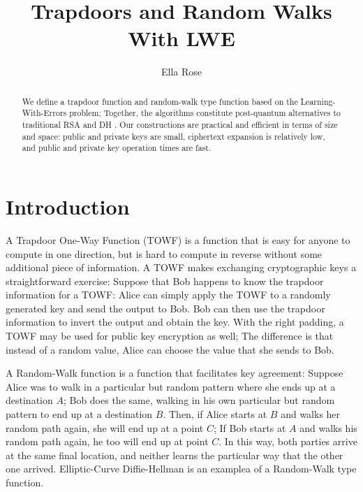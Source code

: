 \documentclass[preprint]{iacrtrans}
\author{Ella Rose}
\institute{Paso Robles, CA \email{python_pride@protonmail.com}}
\title[Trapdoors and Random Walks With LWE]{Trapdoors and Random Walks With LWE}
\begin{document}
\maketitle


\begin{abstract}
 We define a trapdoor function and random-walk type function based on the Learning-With-Errors problem; Together, the algorithms constitute post-quantum alternatives to traditional RSA and DH . Our constructions are practical and efficient in terms of size and space: public and private keys are small, ciphertext expansion is relatively low, and public and private key operation times are fast.
 \end{abstract}

\todototoc
\listoftodos


\section{Introduction}
A Trapdoor One-Way Function (TOWF) is a function that is easy for anyone to compute in one direction, but is hard to compute in reverse without some additional piece of information. A TOWF makes exchanging cryptographic keys a straightforward exercise: Suppose that Bob happens to know the trapdoor information for a TOWF: Alice can simply apply the TOWF to a randomly generated key and send the output to Bob. Bob can then use the trapdoor information to invert the output and obtain the key. With the right padding, a TOWF may be used for public key encryption as well; The difference is that instead of a random value, Alice can choose the value that she sends to Bob. 

A Random-Walk function is a function that facilitates key agreement: Suppose Alice was to walk in a particular but random pattern where she ends up at a destination $A$; Bob does the same, walking in his own particular but random pattern to end up at a destination $B$. Then, if Alice starts at $B$ and walks her random path again, she will end up at a point $C$; If Bob starts at $A$ and walks his random path again, he too will end up at point $C$. In this way, both parties arrive at the same final location, and neither learns the particular way that the other one arrived. Elliptic-Curve Diffie-Hellman is an examplea of a Random-Walk type function.
\end{document}
